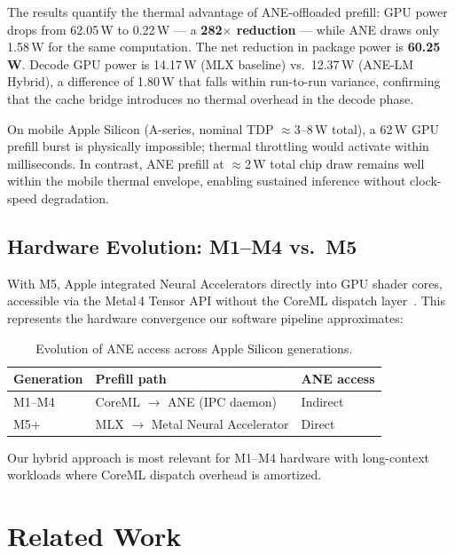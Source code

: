 \documentclass[11pt]{article}
\begin{document}
The results quantify the thermal advantage of ANE-offloaded prefill:
GPU power drops from 62.05\,W to 0.22\,W --- a \textbf{282$\times$ reduction} ---
while ANE draws only 1.58\,W for the same computation.
The net reduction in package power is \textbf{60.25\,W}.
Decode GPU power is 14.17\,W (MLX baseline) vs.\ 12.37\,W (ANE-LM Hybrid),
a difference of 1.80\,W that falls within run-to-run variance,
confirming that the cache bridge introduces no thermal overhead in the
decode phase.

On mobile Apple Silicon (A-series, nominal TDP $\approx$3--8\,W total),
a 62\,W GPU prefill burst is physically impossible; thermal throttling
would activate within milliseconds.
In contrast, ANE prefill at $\approx$2\,W total chip draw remains well
within the mobile thermal envelope, enabling sustained inference without
clock-speed degradation.

\subsection{Hardware Evolution: M1--M4 vs.\ M5}

With M5, Apple integrated Neural Accelerators directly into GPU shader
cores, accessible via the Metal\,4 Tensor API without the CoreML dispatch
layer~\cite{apple_m5_mlx}.
This represents the hardware convergence our software pipeline approximates:

\begin{table}[h]
\centering
\small
\begin{tabular}{@{}lll@{}}
\toprule
Generation & Prefill path & ANE access \\
\midrule
M1--M4 & CoreML $\to$ ANE (IPC daemon) & Indirect \\
M5+ & MLX $\to$ Metal Neural Accelerator & Direct \\
\bottomrule
\end{tabular}
\caption{Evolution of ANE access across Apple Silicon generations.}
\label{tab:m5}
\end{table}

Our hybrid approach is most relevant for M1--M4 hardware with
long-context workloads where CoreML dispatch overhead is amortized.

\section{Related Work}
\label{sec:related}
\end{document}
